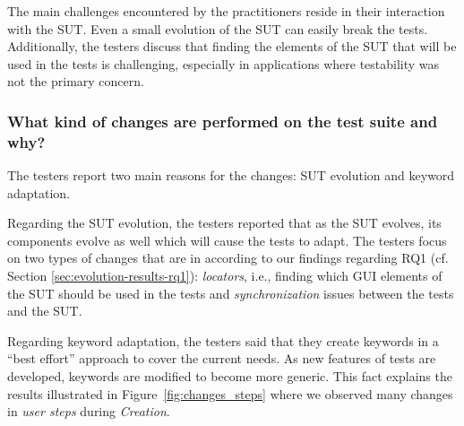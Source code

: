 The main challenges encountered by the practitioners reside in their interaction with the SUT. Even a small evolution of the SUT can easily break the tests. Additionally, the testers discuss that finding the elements of the SUT that will be used in the tests is challenging, especially in applications where testability was not the primary concern.

\subsubsection{What kind of changes are performed on the test suite and why?}

The testers report two main reasons for the changes: SUT evolution and keyword adaptation.

Regarding the SUT evolution, the testers reported that as the SUT evolves, its components evolve as well which will cause the tests to adapt. The testers focus on two types of changes that are in according to our findings regarding RQ1 (cf. Section \ref{sec:evolution-results-rq1}): \emph{locators}, i.e., finding which GUI elements of the SUT should be used in the tests and \emph{synchronization} issues between the tests and the SUT.

Regarding keyword adaptation, the testers said that they create keywords in a ``best effort'' approach to cover the current needs. As new features of tests are developed, keywords are modified to become more generic. This fact explains the results illustrated in Figure~\ref{fig:changes_steps} where we observed many changes in \emph{user steps} during \emph{Creation}.